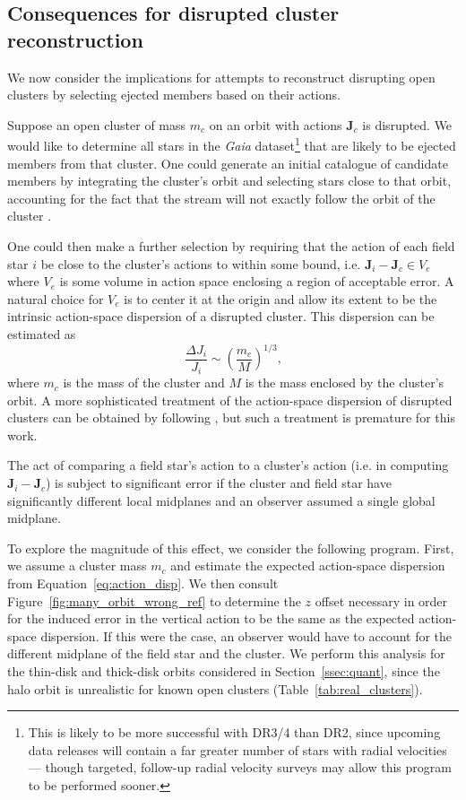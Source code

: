 \documentclass[twocolumn]{aastex62}
\newcommand{\beq}{\begin{equation}}
\newcommand{\eeq}{\end{equation}}
\begin{document}
\subsection{Consequences for disrupted cluster reconstruction}
\label{sssec:reconstruction}

We now consider the implications for attempts to reconstruct disrupting open
clusters by selecting ejected members based on their actions.

Suppose an open cluster of mass $m_c$ on an orbit with actions $\bm{J}_c$ is
disrupted. We would like to determine all stars in the {\em Gaia}
dataset\footnote{This is likely to be more successful with DR3/4 than DR2,
since upcoming data releases will contain a far greater number of stars with
radial velocities --- though targeted, follow-up radial velocity surveys may
allow this program to be performed sooner.} that are likely to be ejected
members from that cluster. One could generate an initial catalogue of
candidate members by integrating the cluster's orbit and selecting stars close
to that orbit, accounting for the fact that the stream will not exactly follow
the orbit of the cluster \citep[e.g.][]{2011MNRAS.413.1852E}.

One could then make a further selection by requiring that the action of each
field star $i$ be close to the cluster's actions to within some bound, i.e.
$\bm{J}_i - \bm{J}_c \in V_e$ where $V_e$ is some volume in action space
enclosing a region of acceptable error. A natural choice for $V_e$ is to
center it at the origin and allow its extent to be the intrinsic action-space
dispersion of a disrupted cluster. This dispersion can be estimated as
\citep[Section~8.3.3][]{2008gady.book.....B}
\beq \label{eq:action_disp}
\frac{\Delta J_i}{J_i} \sim \left(\frac{m_c}{M}\right)^{1/3}\text{,}
\eeq
where $m_c$ is the mass of the cluster and $M$ is the mass enclosed by the
cluster's orbit. A more sophisticated treatment of the action-space dispersion
of disrupted clusters can be obtained by following
\citet{2011MNRAS.413.1852E}, but such a treatment is premature for this work.

The act of comparing a field star's action to a cluster's action (i.e. in
computing $\bm{J}_i - \bm{J}_c$) is subject to significant error if the
cluster and field star have significantly different local midplanes and an
observer assumed a single global midplane.

To explore the magnitude of this effect, we consider the following program.
First, we assume a cluster mass $m_c$ and estimate the expected action-space
dispersion from Equation~\ref{eq:action_disp}. We then consult
Figure~\ref{fig:many_orbit_wrong_ref} to determine the $z$ offset necessary in
order for the induced error in the vertical action to be the same as the
expected action-space dispersion. If this were the case, an observer would
have to account for the different midplane of the field star and the cluster.
We perform this analysis for the thin-disk and thick-disk orbits considered in
Section~\ref{ssec:quant}, since the halo orbit is unrealistic for known open
clusters (Table~\ref{tab:real_clusters}).
\end{document}
